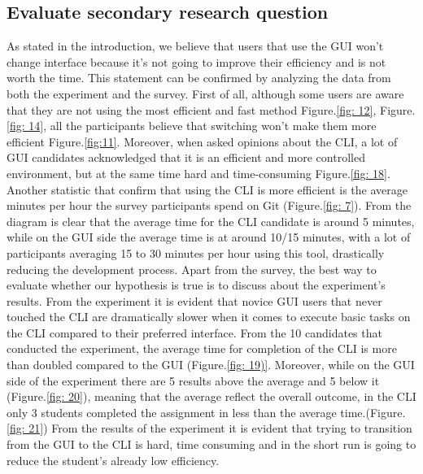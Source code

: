 \documentclass[]{report}
\begin{document}
	\subsection{Evaluate secondary research question}
	As stated in the introduction, we believe that users that use the GUI won't change interface because it's not going to improve their efficiency and is not worth the time.
	This statement can be confirmed by analyzing the data from both the experiment and the survey.
	First of all, although some users are aware that they are not using the most efficient and fast method Figure.\ref{fig: 12}, Figure.\ref{fig: 14}, all the participants believe that switching won't make them more efficient Figure.\ref{fig:11}.
	Moreover, when asked opinions about the CLI, a lot of GUI candidates acknowledged that it is an efficient and more controlled environment, but at the same time hard and time-consuming Figure.\ref{fig: 18}.
	Another statistic that confirm that using the CLI is more efficient is the average minutes per hour the survey participants spend on Git (Figure.\ref{fig: 7}). From the diagram is clear that the average time for the CLI candidate is around 5 minutes, while on the GUI side the average time is at around 10/15 minutes, with a lot of participants averaging 15 to 30 minutes per hour using this tool, drastically reducing the development process.
	Apart from the survey, the best way to evaluate whether our hypothesis is true is to discuss about the experiment's results.
	From the experiment it is evident that novice GUI users that never touched the CLI are dramatically slower when it comes to execute basic tasks on the CLI compared to their preferred interface.
	From the 10 candidates that conducted the experiment, the average time for completion of the CLI is more than doubled compared to the GUI (Figure.\ref{fig: 19)}. Moreover, while on the GUI side of the experiment there are 5 results above the average and 5 below it (Figure.\ref{fig: 20}), meaning that the average reflect the overall outcome, in the CLI only 3 students completed the assignment in less than the average time.(Figure.\ref{fig: 21}) From the results of the experiment it is evident that trying to transition from the GUI to the CLI is hard, time consuming and in the short run is going to reduce the student's already low efficiency.
	
\end{document}
